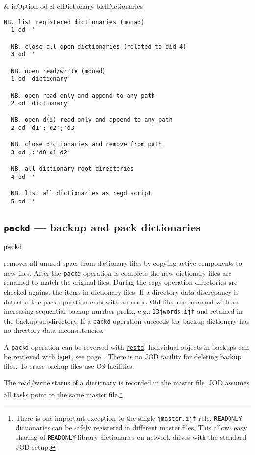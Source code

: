 \begin{wordhead}
\dyad & iaOption od zl \argsep clDictionary \argsep blclDictionaries \\
\end{wordhead}
\begin{lstlisting}[frame=single,framerule=0pt] 
  NB. list registered dictionaries (monad)
  1 od '' 
  
  NB. close all open dictionaries (related to did 4) 
  3 od '' 

  NB. open read/write (monad)
  1 od 'dictionary' 
  
  NB. open read only and append to any path 
  2 od 'dictionary'   

  NB. open d(i) read only and append to any path
  2 od 'd1';'d2';'d3' 
  
  NB. close dictionaries and remove from path
  3 od ;:'d0 d1 d2'  
  
  NB. all dictionary root directories
  4 od ''  
              
  NB. list all dictionaries as regd script
  5 od ''             
\end{lstlisting}


\subsection{\texttt{packd} --- backup and pack dictionaries}\label{ss:packd}

\hypertarget{il:packd}{\texttt{packd}} removes all unused space 
from dictionary files by copying active components to new files.
 After the \texttt{packd} operation is complete the new dictionary files 
 are renamed to match the original files. During the copy operation directories 
 are checked against the items in dictionary files. If 
 a directory data discrepancy is detected
 the pack operation ends with an error. Old files are renamed 
 with an increasing sequential backup number prefix, e.g.: \verb|13jwords.ijf| and 
 retained in the backup subdirectory. If a \texttt{packd} operation succeeds 
 the backup dictionary has no directory data inconsistencies. 

A \texttt{packd} operation can be reversed with \hyperlink{il:restd}{\texttt{restd}}.
Individual objects in backups can be retrieved with \hyperlink{il:bget}{\texttt{bget}}, see page~\pageref{ss:bget}.
There is no JOD facility for deleting  backup files. To erase backup files use OS facilities. 

The read/write status of a dictionary is recorded in 
the master file. JOD assumes all tasks point to the same master file.\footnote{There is one
important exception to the single \texttt{jmaster.ijf} rule. \texttt{READONLY}
dictionaries can be safely registered in different master files. This allows 
easy sharing of \texttt{READONLY} library dictionaries on network drives with
the standard JOD setup.
} 

